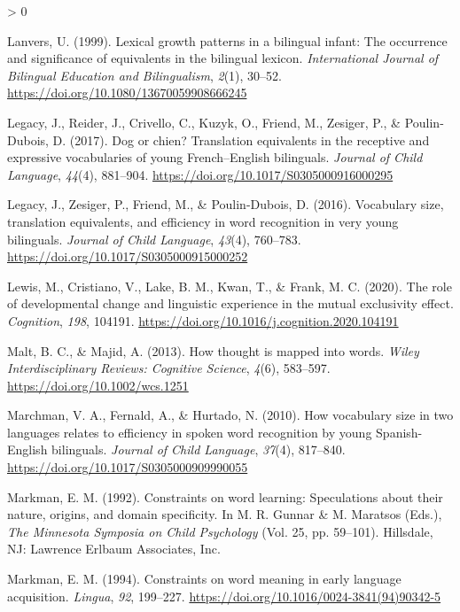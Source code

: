 \documentclass[
  english,
  ,man,floatsintext]{apa6}
\newlength{\cslhangindent}
\newenvironment{CSLReferences}[2] %
 {%
  \setlength{\parindent}{0pt}
  \ifodd #1 \everypar{\setlength{\hangindent}{\cslhangindent}}\ignorespaces\fi
  \ifnum #2 > 0
  \setlength{\parskip}{#2\baselineskip}
  \fi
 }%
 {}
\begin{document}
\begin{CSLReferences}{1}{0}
\leavevmode\hypertarget{ref-Lanvers_1999}{}%
Lanvers, U. (1999). Lexical growth patterns in a bilingual infant: The occurrence and significance of equivalents in the bilingual lexicon. \emph{International Journal of Bilingual Education and Bilingualism}, \emph{2}(1), 30--52. \url{https://doi.org/10.1080/13670059908666245}

\leavevmode\hypertarget{ref-Legacy_etal_2017}{}%
Legacy, J., Reider, J., Crivello, C., Kuzyk, O., Friend, M., Zesiger, P., \& Poulin-Dubois, D. (2017). Dog or chien? Translation equivalents in the receptive and expressive vocabularies of young {F}rench--{E}nglish bilinguals. \emph{Journal of Child Language}, \emph{44}(4), 881--904. \url{https://doi.org/10.1017/S0305000916000295}

\leavevmode\hypertarget{ref-Legacy_etal_2016}{}%
Legacy, J., Zesiger, P., Friend, M., \& Poulin-Dubois, D. (2016). Vocabulary size, translation equivalents, and efficiency in word recognition in very young bilinguals. \emph{Journal of Child Language}, \emph{43}(4), 760--783. \url{https://doi.org/10.1017/S0305000915000252}

\leavevmode\hypertarget{ref-Lewis_etal_2020}{}%
Lewis, M., Cristiano, V., Lake, B. M., Kwan, T., \& Frank, M. C. (2020). The role of developmental change and linguistic experience in the mutual exclusivity effect. \emph{Cognition}, \emph{198}, 104191. \url{https://doi.org/10.1016/j.cognition.2020.104191}

\leavevmode\hypertarget{ref-Malt_Majid_2013}{}%
Malt, B. C., \& Majid, A. (2013). How thought is mapped into words. \emph{Wiley Interdisciplinary Reviews: Cognitive Science}, \emph{4}(6), 583--597. \url{https://doi.org/10.1002/wcs.1251}

\leavevmode\hypertarget{ref-Marchman_etal_2010}{}%
Marchman, V. A., Fernald, A., \& Hurtado, N. (2010). How vocabulary size in two languages relates to efficiency in spoken word recognition by young {S}panish-{E}nglish bilinguals. \emph{Journal of Child Language}, \emph{37}(4), 817--840. \url{https://doi.org/10.1017/S0305000909990055}

\leavevmode\hypertarget{ref-Markman_1992}{}%
Markman, E. M. (1992). Constraints on word learning: Speculations about their nature, origins, and domain specificity. In M. R. Gunnar \& M. Maratsos (Eds.), \emph{The {M}innesota {S}ymposia on {C}hild {P}sychology} (Vol. 25, pp. 59--101). Hillsdale, NJ: Lawrence Erlbaum Associates, Inc.

\leavevmode\hypertarget{ref-Markman_1994}{}%
Markman, E. M. (1994). Constraints on word meaning in early language acquisition. \emph{Lingua}, \emph{92}, 199--227. \url{https://doi.org/10.1016/0024-3841(94)90342-5}


\end{CSLReferences}
\end{document}
